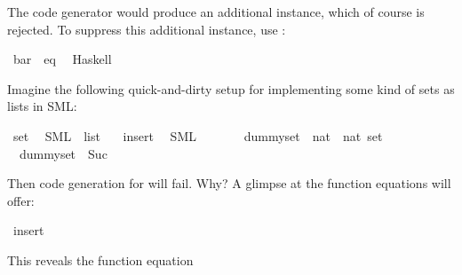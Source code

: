 \begin{isabellebody}
%
\isadelimtt
%
\endisadelimtt
%
\begin{isamarkuptext}%
The code generator would produce
    an additional instance, which of course is rejected.
    To suppress this additional instance, use
    \isa{{\isasymCODEINSTANCE}}:%
\end{isamarkuptext}%
\isamarkuptrue%
%
\isadelimtt
%
\endisadelimtt
%
\isatagtt
{}\isamarkupfalse%
\ bar\ {\isacharcolon}{\isacharcolon}\ eq\isanewline
\ \ {\isacharparenleft}Haskell\ {\isacharminus}{\isacharparenright}%
\endisatagtt
{\isafoldtt}%
%
\isadelimtt
%
\endisadelimtt
%
\isamarkuptrue%
%
\begin{isamarkuptext}%
Imagine the following quick-and-dirty setup for implementing
  some kind of sets as lists in SML:%
\end{isamarkuptext}%
\isamarkuptrue%
%
\isadelimtt
%
\endisadelimtt
%
\isatagtt
{}\isamarkupfalse%
\ set\isanewline
\ \ {\isacharparenleft}SML\ {\isachardoublequoteopen}{\isacharunderscore}\ list{\isachardoublequoteclose}{\isacharparenright}\isanewline
\isanewline
{}\isamarkupfalse%
\ {\isachardoublequoteopen}{\isacharbraceleft}{\isacharbraceright}{\isachardoublequoteclose}\ \ insert\isanewline
\ \ {\isacharparenleft}SML\ {\isachardoublequoteopen}{\isacharbang}{\isacharbrackleft}{\isacharbrackright}{\isachardoublequoteclose}\ \ \ {}\ {\isachardoublequoteopen}{\isacharcolon}{\isacharcolon}{\isachardoublequoteclose}{\isacharparenright}%
\endisatagtt
{\isafoldtt}%
%
\isadelimtt
%
\endisadelimtt
\isanewline
\isanewline
{}\isamarkupfalse%
\isanewline
\ \ dummy{\isacharunderscore}set\ {\isacharcolon}{\isacharcolon}\ {\isachardoublequoteopen}{\isacharparenleft}nat\ {\isasymRightarrow}\ nat{\isacharparenright}\ set{\isachardoublequoteclose}\isanewline
\ \ {\isachardoublequoteopen}dummy{\isacharunderscore}set\ {\isacharequal}\ {\isacharbraceleft}Suc{\isacharbraceright}{\isachardoublequoteclose}%
\begin{isamarkuptext}%
Then code generation for  will fail.
  Why? A glimpse at the function equations will offer:%
\end{isamarkuptext}%
\isamarkuptrue%
\isamarkupfalse%
\ {\isacharparenleft}insert{\isacharparenright}%
\begin{isamarkuptext}%
This reveals the function equation 

\end{isamarkuptext}
\end{isabellebody}
